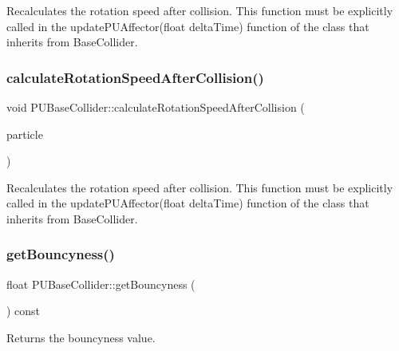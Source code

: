 Recalculates the rotation speed after collision. This function must be explicitly called in the update\+P\+U\+Affector(float delta\+Time) function of the class that inherits from Base\+Collider. \mbox{\label{classPUBaseCollider_a96e9b27b4c2d2dac1bd47b7531a4598f}} 
\subsubsection{\texorpdfstring{calculate\+Rotation\+Speed\+After\+Collision()}{calculateRotationSpeedAfterCollision()}\hspace{0.1cm}{\footnotesize\ttfamily [2/2]}}
{\footnotesize\ttfamily void P\+U\+Base\+Collider\+::calculate\+Rotation\+Speed\+After\+Collision (\begin{DoxyParamCaption}\item[{\hyperlink{structPUParticle3D}{P\+U\+Particle3D} $\ast$}]{particle }\end{DoxyParamCaption})}

Recalculates the rotation speed after collision. This function must be explicitly called in the update\+P\+U\+Affector(float delta\+Time) function of the class that inherits from Base\+Collider. \mbox{\label{classPUBaseCollider_a13c2ec2d478b4923cdfe3adad3449c57}} 
\subsubsection{\texorpdfstring{get\+Bouncyness()}{getBouncyness()}\hspace{0.1cm}{\footnotesize\ttfamily [1/2]}}
{\footnotesize\ttfamily float P\+U\+Base\+Collider\+::get\+Bouncyness (\begin{DoxyParamCaption}{ }\end{DoxyParamCaption}) const}

Returns the bouncyness value. \mbox{\label{classPUBaseCollider_a13c2ec2d478b4923cdfe3adad3449c57}} 
